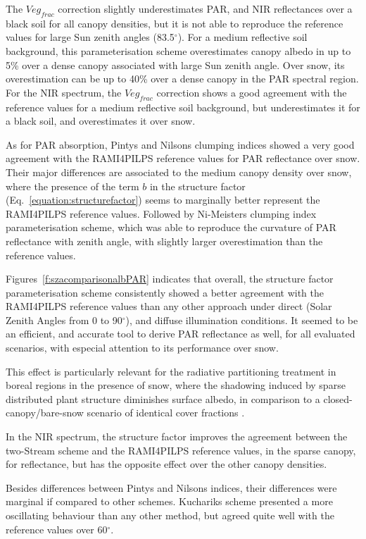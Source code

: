 The $Veg_{frac}$ correction slightly underestimates PAR, and NIR reflectances over a black soil for all canopy densities, but it is not able to reproduce the reference values for large Sun zenith angles (83.5$^{\circ}$). For a medium reflective soil background, this parameterisation scheme overestimates canopy albedo in up to 5\% over a dense canopy associated with large Sun zenith angle. Over snow, its overestimation can be up to 40\% over a dense canopy in the PAR spectral region.
For the NIR spectrum, the $Veg_{frac}$ correction shows a good agreement with the reference values for a medium reflective soil background, but underestimates it for a black soil, and overestimates it over snow.

As for PAR absorption, Pinty\textquotesingle s and Nilson\textquotesingle s clumping indices showed a very good agreement with the RAMI4PILPS reference values for PAR reflectance over snow. Their major differences are associated to the medium canopy density over snow, where the presence of the term $b$ in the structure factor (Eq.~\ref{equation:structurefactor}) seems to marginally better represent the RAMI4PILPS reference values. Followed by Ni-Meister\textquotesingle s clumping index parameterisation scheme, which was able to reproduce the curvature of PAR reflectance with zenith angle, with slightly larger overestimation than the reference values.

Figures~\ref{f:szacomparisonalbPAR} indicates that overall, the structure factor parameterisation scheme consistently showed a better agreement with the RAMI4PILPS reference values than any other approach under direct (Solar Zenith Angles from 0 to 90$^{\circ}$), and diffuse illumination conditions. It seemed to be an efficient, and accurate tool to derive PAR reflectance as well, for all evaluated scenarios, with especial attention to its performance over snow.

This effect is particularly relevant for the radiative partitioning treatment in boreal regions in the presence of snow, where the shadowing induced by sparse distributed plant structure diminishes surface albedo, in comparison to a closed-canopy/bare-snow scenario of identical cover fractions \citep{Viterbo1999}. 

In the NIR spectrum, the structure factor improves the agreement between the two-Stream scheme and the RAMI4PILPS reference values, in the sparse canopy, for reflectance, but has the opposite effect over the other canopy densities.

Besides differences between Pinty\textquotesingle s and Nilson\textquotesingle s indices, their differences were marginal if compared to other schemes. Kucharik\textquotesingle s scheme presented a more oscillating behaviour than any other method, but agreed quite well with the reference values over 60$^{\circ}$. 

